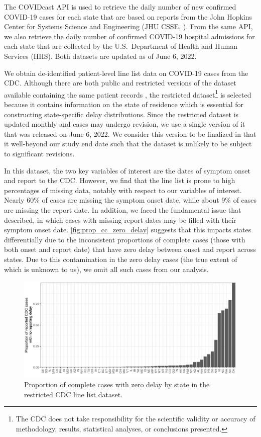 \documentclass{article}
\begin{document}
The COVIDcast API \citep{reinhart2021open} is used to retrieve the daily number
of new confirmed COVID-19 cases for each state that are based on reports from
the John Hopkins Center for Systems Science and Engineering (JHU CSSE,
\citealp{dong2020interactive}). From the same API, we also retrieve the daily
number of confirmed COVID-19 hospital admissions for each state that are
collected by the U.S.\ Department of Health and Human Services (HHS). Both
datasets are updated as of June 6, 2022.

We obtain de-identified patient-level line list data on COVID-19 cases from the
CDC. Although there are both public and restricted versions of the dataset
available containing the same patient records \citep{cdc2020casepub,
cdc2020caserestr}, the restricted dataset\footnote{The CDC does not take
responsibility for the scientific validity or accuracy of methodology, results,
statistical analyses, or conclusions presented.} is selected because it contains
information on the state of residence which is essential for constructing
state-specific delay distributions. Since the restricted dataset is updated
monthly and cases may undergo revision, we use a single version of it that was
released on June 6, 2022. We consider this version to be finalized in that it
well-beyond our study end date such that the dataset is unlikely to be subject
to significant revisions.

In this dataset, the two key variables of interest are the dates of symptom
onset and report to the CDC. However, we find that the line list is prone to
high percentages of missing data, notably with respect to our variables of
interest. Nearly 60\% of cases are missing the symptom onset date, while about
9\% of cases are missing the report date. In addition, we faced the
fundamental issue that \citet{jahja2022real} described, in which cases with
missing report dates may be filled with their symptom onset date.
\autoref{fig:prop_cc_zero_delay} suggests that this impacts states differentially
due to the inconsistent proportions of complete cases (those with
both onset and report date) that have zero delay between onset and report across
states. Due to this contamination in the zero delay cases (the true extent of
which is unknown to us), we omit all such cases from our analysis.

\begin{figure}[!tb]
\centering
    \includegraphics[width=.99\textwidth]{prop_cc_zero_delay.pdf}
    \caption{Proportion of complete cases with zero delay by state in the 
    restricted CDC line list dataset.}
    \label{fig:prop_cc_zero_delay}
\end{figure}
\end{document}
